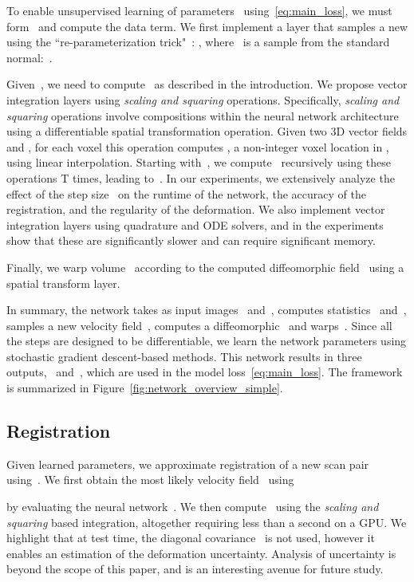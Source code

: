 \documentclass{article}
\newcommand{\citep}{\cite}
\begin{document}
To enable unsupervised learning of parameters~ using~\eqref{eq:main_loss}, we must form~\mbox{} and compute the data term. We first implement a layer that samples a new \mbox{} using the ``re-parameterization trick"~\citep{kingma2013}: , where~ is a sample from the standard normal:~.




Given~, we need to compute~\mbox{} as described in the introduction. We propose vector integration layers using \emph{scaling and squaring} operations.  
Specifically, \emph{scaling and squaring} operations involve compositions within the neural network architecture using a differentiable spatial transformation operation. Given two 3D vector fields  and , for each voxel  this operation computes , a non-integer voxel location  in , using linear interpolation. Starting with~, we compute~\mbox{} recursively using these operations T times, leading to~. In our experiments, we extensively analyze the effect of the step size~ on the runtime of the network, the accuracy of the registration, and the regularity of the deformation. We also implement vector integration layers using quadrature and ODE solvers, and in the experiments show that these are significantly slower and can require significant memory.

Finally, we warp volume~ according to the computed diffeomorphic field~ using a spatial transform layer. 

In summary, the network takes as input images~ and~, computes statistics~ and~, samples a new velocity field~, computes a diffeomorphic~ and warps~. Since all the steps are designed to be differentiable, we  learn the network parameters using stochastic gradient descent-based methods. This network results in three outputs,~ and~, which are used in the model loss~\eqref{eq:main_loss}.
 The framework is summarized in Figure~\ref{fig:network_overview_simple}. 








\subsection{Registration}


Given learned parameters, we approximate registration of a new scan pair~ using~. 
We first obtain the most likely velocity field~ using

by evaluating the neural network~. We then compute~ using the \textit{scaling and squaring} based integration, altogether requiring less than a second on a GPU. We highlight that at test time, the diagonal covariance~ is not used, however it enables an estimation of the deformation uncertainty. Analysis of uncertainty is beyond the scope of this paper, and is an interesting avenue for future study.
\end{document}
